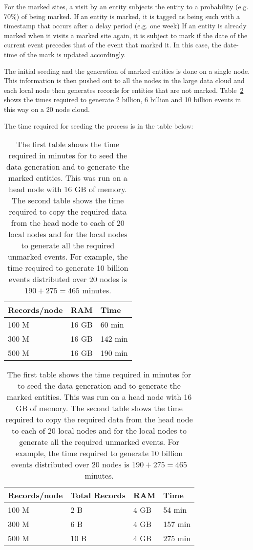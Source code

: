 \documentclass{acm_proc_article-sp}
\begin{document}
For the marked sites, a visit by an entity subjects
the entity to a probability (e.g. 70\%) of being marked.
If an entity is marked, it is tagged as being such with a
timestamp that occurs after a delay period (e.g. one week)
If an entity is already marked when it 
visits a marked site again, it is subject to mark if the date of
the current event precedes that of the event that marked it. 
In this case, the date-time of the mark is updated
accordingly. 

The initial seeding and the generation of marked entities is done
on a single node.  This information is then pushed out to all the nodes
in the large data cloud and each local node then generates records for entities
that are not marked.  Table~\ref{table:malgen-times} shows the times
required to generate 2 billion, 6 billion and 10 billion events in this
way on a 20 node cloud.

The time required for seeding the process is in the table below:
\begin{table}
\begin{center}
\begin{tabular}{|l|l|l|} \hline
Records/node & RAM & Time \\ \hline
100 M & 16 GB & 60 min \\ \hline
300 M & 16 GB & 142 min \\ \hline
500 M & 16 GB & 190 min \\ \hline
\end{tabular}

\medbreak
\medbreak

\begin{tabular}{|l|l|l|l|} \hline
Records/node & Total Records & RAM & Time \\ \hline
100 M & 2 B & 4 GB & 54 min \\ \hline
300 M & 6 B & 4 GB & 157 min \\ \hline
500 M & 10 B & 4 GB & 275 min \\ \hline
\end{tabular}

\caption{The first table shows the time required in minutes for
  \malgen to seed the data generation and to generate the marked
  entities.  This was run on a head node with 16 GB of memory.  The
  second table shows the time required to copy the required data from
  the head node to each of 20 local nodes and for the local nodes to
  generate all the required unmarked events.  For example, the time
  required to generate 10 billion events distributed over 20 nodes is
  $190+275=465$ minutes. }
\label{table:malgen-times}
\end{center}
\end{table}
\end{document}
